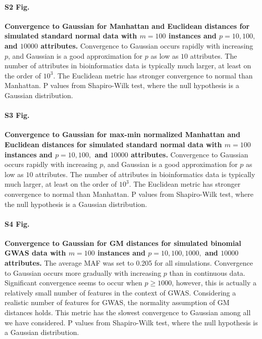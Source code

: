 \documentclass[10pt,letterpaper]{article}
\begin{document}
\paragraph*{S2 Fig.}
\label{S2_Fig}
{\bf Convergence to Gaussian for Manhattan and Euclidean distances for simulated standard normal data with $m=100$ instances and $p=10, 100,$ and $10000$ attributes.} Convergence to Gaussian occurs rapidly with increasing $p$, and Gaussian is a good approximation for $p$ as low as $10$ attributes. The number of attributes in bioinformatics data is typically much larger, at least on the order of $10^3$. The Euclidean metric has stronger convergence to normal than Manhattan.  P values from Shapiro-Wilk test, where the null hypothesis is a Gaussian distribution.

\paragraph*{S3 Fig.}
\label{S3_Fig}
{\bf Convergence to Gaussian for max-min normalized Manhattan and Euclidean distances for simulated standard normal data with $m=100$ instances and $p=10, 100,$ and $10000$ attributes.} Convergence to Gaussian occurs rapidly with increasing $p$, and Gaussian is a good approximation for $p$ as low as $10$ attributes. The number of attributes in bioinformatics data is typically much larger, at least on the order of $10^3$. The Euclidean metric has stronger convergence to normal than Manhattan.  P values from Shapiro-Wilk test, where the null hypothesis is a Gaussian distribution.

\paragraph*{S4 Fig.}
\label{S4_Fig}
{\bf Convergence to Gaussian for GM distances for simulated binomial GWAS data with $m=100$ instances and $p=10, 100, 1000,$ and $10000$ attributes.} The average MAF was set to 0.205 for all simulations. Convergence to Gaussian occurs more gradually with increasing $p$ than in continuous data. Significant convergence seems to occur when $p \geq 1000$, however, this is actually a relatively small number of features in the context of GWAS. Considering a realistic number of features for GWAS, the normality assumption of GM distances holds. This metric has the slowest convergence to Gaussian among all we have considered. P values from Shapiro-Wilk test, where the null hypothesis is a Gaussian distribution.
\end{document}
